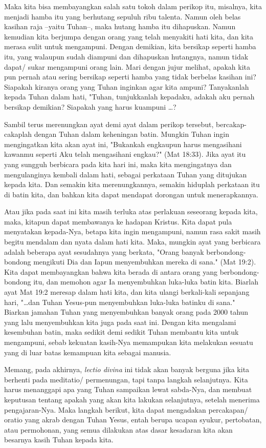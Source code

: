 Maka kita bisa membayangkan salah satu tokoh dalam perikop itu, misalnya, kita menjadi hamba itu yang berhutang sepuluh ribu talenta. Namun oleh belas kasihan raja --yaitu Tuhan--, maka hutang hamba itu dihapuskan. Namun kemudian kita berjumpa dengan orang yang telah menyakiti hati kita, dan kita merasa sulit untuk mengampuni. Dengan demikian, kita bersikap seperti hamba itu, yang walaupun sudah diampuni dan dihapuskan hutangnya, namun tidak dapat/ sukar mengampuni orang lain. Mari dengan jujur melihat, apakah kita pun pernah atau sering bersikap seperti hamba yang tidak berbelas kasihan ini?  Siapakah kiranya orang yang Tuhan inginkan agar kita ampuni? Tanyakanlah kepada Tuhan dalam hati, "Tuhan, tunjukkanlah kepadaku, adakah aku pernah bersikap demikian? Siapakah yang harus kuampuni \ldots ?

Sambil terus merenungkan ayat demi ayat dalam perikop tersebut, bercakap-cakaplah dengan Tuhan dalam keheningan batin. Mungkin Tuhan ingin mengingatkan kita akan ayat ini, "Bukankah engkaupun harus mengasihani kawanmu seperti Aku telah mengasihani engkau?" (Mat 18:33). Jika ayat itu yang sungguh berbicara pada kita hari ini, maka kita mengingatnya dan mengulanginya kembali dalam hati, sebagai perkataan Tuhan yang ditujukan kepada kita. Dan semakin kita merenungkannya, semakin hiduplah perkataan itu di batin kita, dan bahkan kita dapat mendapat dorongan untuk menerapkannya.

Atau jika pada saat ini kita masih terluka atas perlakuan seseorang kepada kita, maka, kitapun dapat membawanya ke hadapan Kristus. Kita dapat pula menyatakan kepada-Nya, betapa kita ingin mengampuni, namun rasa sakit masih begitu mendalam dan nyata dalam hati kita. Maka, mungkin ayat yang berbicara adalah beberapa ayat sesudahnya yang berkata, "Orang banyak berbondong-bondong mengikuti Dia dan Iapun menyembuhkan mereka di sana." (Mat 19:2). Kita dapat membayangkan bahwa kita berada di antara orang yang berbondong-bondong itu, dan memohon agar Ia menyembuhkan luka-luka batin kita. Biarlah ayat Mat 19:2 meresap dalam hati kita, dan kita ulangi berkali-kali sepanjang hari, "\dots dan Tuhan Yesus-pun menyembuhkan luka-luka batinku di sana." Biarkan jamahan Tuhan yang menyembuhkan banyak orang pada 2000 tahun yang lalu menyembuhkan kita juga pada saat ini. Dengan kita mengalami kesembuhan batin, maka sedikit demi sedikit Tuhan membantu kita untuk mengampuni, sebab kekuatan kasih-Nya memampukan kita melakukan sesuatu yang di luar batas kemampuan kita sebagai manusia.

Memang, pada akhirnya, \textit{lectio divina} ini tidak akan banyak berguna jika kita berhenti pada meditatio/ permenungan, tapi tanpa langkah selanjutnya. Kita harus menanggapi apa yang Tuhan sampaikan lewat sabda-Nya, dan membuat keputusan tentang apakah yang akan kita lakukan selanjutnya, setelah menerima pengajaran-Nya. Maka langkah berikut, kita dapat mengadakan percakapan/ oratio yang akrab dengan Tuhan Yesus, entah berupa ucapan syukur, pertobatan, atau permohonan, yang semua dilakukan atas dasar kesadaran kita akan besarnya kasih Tuhan kepada kita. 

